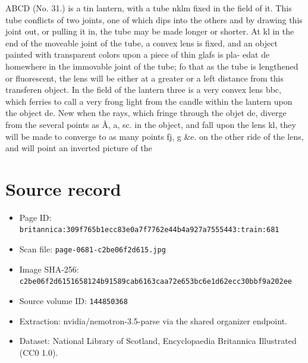 \documentclass{article}
\begin{document}
ABCD (No. 31.) is a tin lantern, with a tube nklm fixed in the field of it. This tube conflicts of two joints, one of which dips into the others and by drawing this joint out, or pulling it in, the tube may be made longer or shorter. At kl in the end of the moveable joint of the tube, a convex lens is fixed, and an object painted with transparent colors upon a piece of thin glafs is pla- edat de homewhere in the immovable joint of the tube; fo that as the tube is lengthened or fluorescent, the lens will be either at a greater or a left distance from this transferen object. In the field of the lantern three is a very convex lens bbc, which ferries to call a very frong light from the candle within the lantern upon the object de. New when the rays, which fringe through the objet de, diverge from the several points as Å, a, sc. in the object, and fall upon the lens kl, they will be made to converge to as many points fj, g \&e. on the other ride of the lens, and will point an inverted picture of the

\section*{Source record}
\begin{itemize}
\item Page ID: \texttt{britannica:309f765b1ecc83e0a7f7762e44b4a927a7555443:train:681}
\item Scan file: \texttt{page-0681-c2be06f2d615.jpg}
\item Image SHA-256: \texttt{c2be06f2d6151658124b91589cab6163caa72e653bc6e1d62ecc30bbf9a202ee}
\item Source volume ID: \texttt{144850368}
\item Extraction: nvidia/nemotron-3.5-parse via the shared organizer endpoint.
\item Dataset: National Library of Scotland, Encyclopaedia Britannica Illustrated (CC0 1.0).
\end{itemize}
\end{document}
